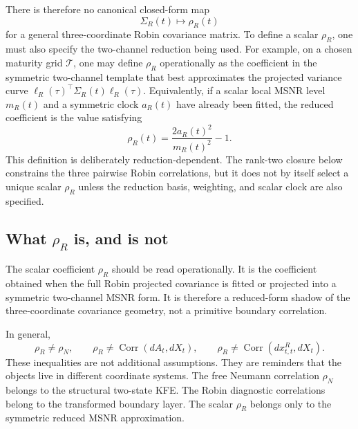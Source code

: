 \documentclass[11pt]{article}
\numberwithin{equation}{section}
\begin{document}
There is therefore no canonical closed-form map
\[
        \Sigma_R(t) \longmapsto \rho_R(t)
\]
for a general three-coordinate Robin covariance matrix.  To define a scalar \(\rho_R\), one must also specify the two-channel reduction being used.  For example, on a chosen maturity grid \(\mathcal T\), one may define \(\rho_R\) operationally as the coefficient in the symmetric two-channel template that best approximates the projected variance curve \(\ell_R(\tau)^\top\Sigma_R(t)\ell_R(\tau)\).  Equivalently, if a scalar local MSNR level \(m_R(t)\) and a symmetric clock \(a_R(t)\) have already been fitted, the reduced coefficient is the value satisfying
\begin{equation}
\label{eq:rhoR-operational-definition}
        \rho_R(t)
        =
        \frac{2a_R(t)^2}{m_R(t)^2}-1.
\end{equation}
This definition is deliberately reduction-dependent.  The rank-two closure below constrains the three pairwise Robin correlations, but it does not by itself select a unique scalar \(\rho_R\) unless the reduction basis, weighting, and scalar clock are also specified.

\subsection{What \texorpdfstring{$\rho_R$}{rhoR} is, and is not}

The scalar coefficient \(\rho_R\) should be read operationally. It is the coefficient obtained when the full Robin projected covariance is fitted or projected into a symmetric two-channel MSNR form. It is therefore a reduced-form shadow of the three-coordinate covariance geometry, not a primitive boundary correlation.

In general,
\begin{equation}
\label{eq:rhoR-not-identities}
\rho_R\neq \rho_N,
\qquad
\rho_R\neq \operatorname{Corr}(dA_t,dX_t),
\qquad
\rho_R\neq \operatorname{Corr}(dx^R_{t,t},dX_t).
\end{equation}
These inequalities are not additional assumptions. They are reminders that the objects live in different coordinate systems. The free Neumann correlation \(\rho_N\) belongs to the structural two-state KFE. The Robin diagnostic correlations belong to the transformed boundary layer. The scalar \(\rho_R\) belongs only to the symmetric reduced MSNR approximation.
\end{document}

